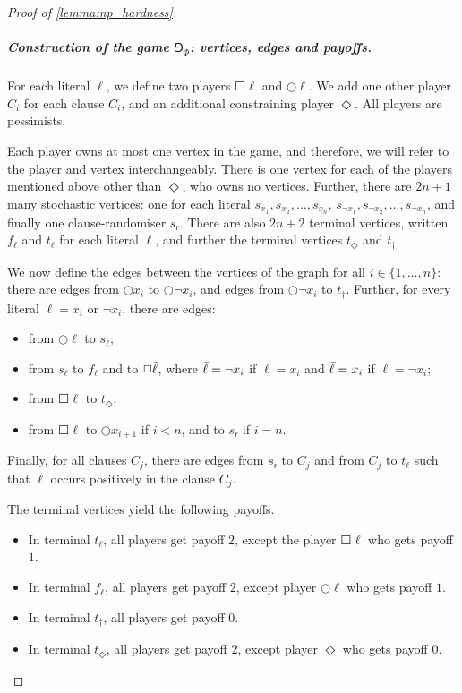 \begin{proof}[Proof of \cref{lemma:np_hardness}]
\subparagraph*{Construction of the game $\Game_\Phi$: vertices, edges and payoffs.}
For each literal $\ell$, we define two players $\Square\ell$ and $\Circle\ell$. We add one other player $C_i$ for each clause $C_i$, and an additional constraining player $\Diamond$.
All players are pessimists.

Each player owns at most one vertex in the game, and therefore, we will refer to the player and vertex interchangeably. There is one vertex for each of the players mentioned above other than $\Diamond$, who owns no vertices. Further, there are $2n + 1$ many stochastic vertices: one for each literal $s_{x_1},s_{x_2},\dots,s_{x_n}$,  $s_{\neg x_1},s_{\neg x_2},\dots,s_{\neg x_n}$, and finally one clause-randomiser $s_\mathsf{r}$. 
There are also $2n + 2$ terminal vertices, written $f_{\ell}$ and $t_{\ell}$ for each literal $\ell$, and further the terminal vertices $t_\Diamond$ and $t_\dag$.

We now define the edges between the vertices of the graph for all $i\in \{1, \dots, n\}$:  there are edges from $\Circle x_i$ to $\Circle\neg x_i$, and edges from $\Circle\neg x_i$ to $t_\dag$.
    Further, for every literal $\ell = x_i$ or $\neg x_i$, there are edges:
    \begin{itemize}
        \item from $\Circle\ell$ to $s_{\ell}$;
        \item from $s_{\ell}$ to $f_\ell$ and to $\Square\Bar{\ell}$, where $\Bar{\ell} = \neg x_i$ if $\ell = x_i$ and $\Bar{\ell} = x_i$ if $\ell = \neg x_i$;
        \item from $\Square\ell$ to $t_\Diamond$;
        \item from $\Square\ell$ to $\Circle x_{i+1}$ if  $i<n$,  and  to $s_\mathsf{r}$ if  $i=n$.%
    \end{itemize}
    Finally, for all clauses $C_j$, there are edges from $s_\mathsf{r}$ to $C_j$ and from $C_j$ to $t_{\ell}$ such that $\ell$ occurs positively in the clause $C_j$.

    The terminal vertices yield the following payoffs.
\begin{itemize}
    \item In terminal $t_\ell$, all players get payoff $2$, except the player $\Square \ell$ who gets payoff $1$. 
    \item In terminal $f_\ell$, all players get payoff $2$, except player $\Circle \ell$ who gets payoff $1$.
    \item In terminal $t_\dag$, all players get payoff $0$.
    \item In terminal $t_\Diamond$, all players get payoff $2$, except player $\Diamond$ who gets payoff $0$.%
\end{itemize}    


\end{proof}
